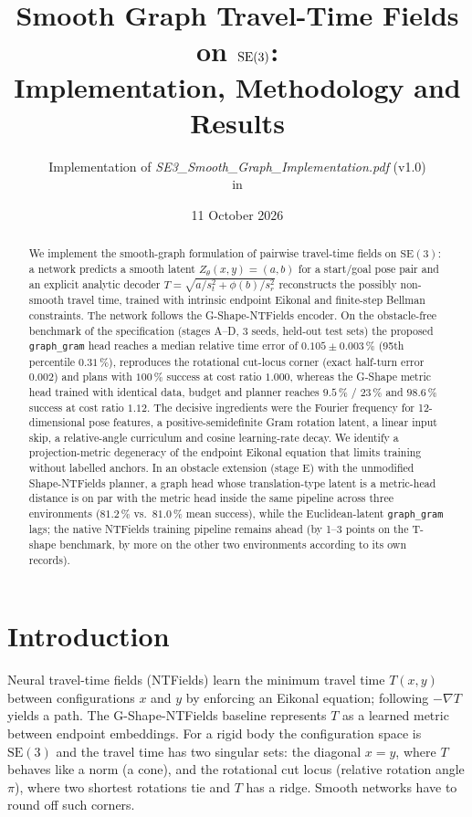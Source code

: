 \documentclass[11pt]{article}
\title{Smooth Graph Travel-Time Fields on \texorpdfstring{$\SE$}{SE(3)}:\\[2pt]
\large Implementation, Methodology and Results}
\author{Implementation of \emph{SE3\_Smooth\_Graph\_Implementation.pdf} (v1.0)\\
in \code{G-Shape-NTFields/models/graph\_method}}
\date{11 October 2026}
\newcommand{\SE}{\mathrm{SE}(3)}
\newcommand{\code}[1]{\texttt{#1}}
\newcommand{\pct}{\,\%}
\begin{document}
\maketitle

\begin{abstract}
We implement the smooth-graph formulation of pairwise travel-time fields on $\SE$: a
network predicts a smooth latent $Z_\theta(x,y)=(a,b)$ for a start/goal pose pair and an explicit
analytic decoder $T=\sqrt{a/s_t^2+\phi(b)/s_r^2}$ reconstructs the possibly non-smooth travel time,
trained with intrinsic endpoint Eikonal and finite-step Bellman constraints. The network follows the
G-Shape-NTFields encoder. On the obstacle-free benchmark of the specification (stages A--D, 3 seeds,
held-out test sets) the proposed \code{graph\_gram} head reaches a median relative time error of
$0.105\pm0.003\pct$ (95th percentile $0.31\pct$), reproduces the rotational cut-locus corner
(exact half-turn error $0.002$) and plans with $100\pct$ success at cost ratio $1.000$, whereas the
G-Shape metric head trained with identical data, budget and planner reaches $9.5\pct$ / $23\pct$ and
$98.6\pct$ success at cost ratio $1.12$. The decisive ingredients were the Fourier frequency for
12-dimensional pose features, a positive-semidefinite Gram rotation latent, a linear input skip, a
relative-angle curriculum and cosine learning-rate decay. We identify a projection-metric degeneracy
of the endpoint Eikonal equation that limits training without labelled anchors. In an obstacle
extension (stage E) with the unmodified Shape-NTFields planner, a graph head whose translation-type
latent is a metric-head distance is on par with the metric head inside the same pipeline across three
environments ($81.2\pct$ vs.\ $81.0\pct$ mean success), while the Euclidean-latent \code{graph\_gram}
lags; the native NTFields training pipeline remains ahead (by 1--3 points on the T-shape benchmark, by more
on the other two environments according to its own records).
\end{abstract}

\tableofcontents

\section{Introduction}

Neural travel-time fields (NTFields) learn the minimum travel time $T(x,y)$ between configurations
$x$ and $y$ by enforcing an Eikonal equation; following $-\nabla T$ yields a path. The G-Shape-NTFields
baseline represents $T$ as a learned metric between endpoint embeddings. For a rigid body the
configuration space is $\SE$ and the travel time has two singular sets: the diagonal $x=y$, where $T$
behaves like a norm (a cone), and the rotational cut locus (relative rotation angle $\pi$), where two
shortest rotations tie and $T$ has a ridge. Smooth networks have to round off such corners.
\end{document}
